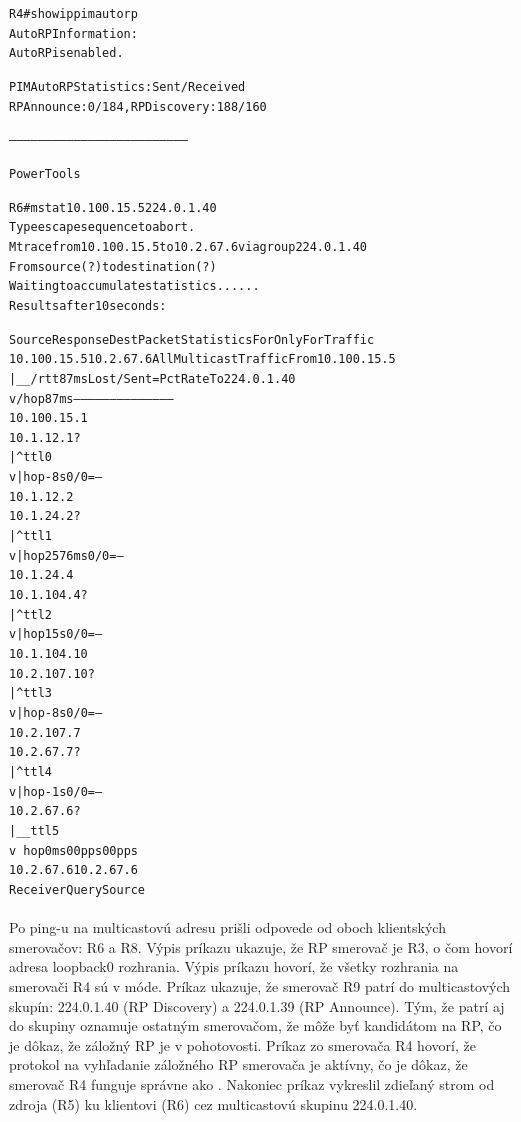 \documentclass[12pt,twoside,a4paper]{report}
\begin{document}
\noindent
{\selectfont
\begin{small}
\begin{alltt}
R4#show ip pim autorp
AutoRP Information:
  AutoRP is enabled.

PIM AutoRP Statistics: Sent/Received
  RP Announce: 0/184, RP Discovery: 188/160


---------------------------------------------------------------------------


Power Tools

R6#mstat 10.100.15.5 224.0.1.40
Type escape sequence to abort.
Mtrace from 10.100.15.5 to 10.2.67.6 via group 224.0.1.40
From source (?) to destination (?)
Waiting to accumulate statistics......
Results after 10 seconds:

  Source        Response Dest   Packet Statistics For     Only For Traffic
10.100.15.5     10.2.67.6       All Multicast Traffic     From 10.100.15.5
     |       __/  rtt 87   ms   Lost/Sent = Pct  Rate     To 224.0.1.40
     v      /     hop 87   ms   ---------------------     --------------------
10.100.15.1
10.1.12.1       ?
     |     ^      ttl   0
     v     |      hop -8   s     0/0 = --%
10.1.12.2
10.1.24.2       ?
     |     ^      ttl   1
     v     |      hop 2576 ms    0/0 = --%
10.1.24.4
10.1.104.4      ?
     |     ^      ttl   2
     v     |      hop 15   s     0/0 = --%
10.1.104.10
10.2.107.10     ?
     |     ^      ttl   3
     v     |      hop -8   s     0/0 = --%
10.2.107.7
10.2.67.7       ?
     |     ^      ttl   4
     v     |      hop -1   s     0/0 = --%
10.2.67.6       ?
     |      \__   ttl   5
     v         \  hop 0    ms        0         0 pps           0    0 pps
10.2.67.6       10.2.67.6
  Receiver      Query Source

\end{alltt}
\end{small}
}

\paragraph{}
Po ping-u na multicastovú adresu prišli odpovede od oboch klientských smerovačov: R6 a R8. Výpis príkazu  ukazuje, že RP smerovač je R3, o čom hovorí adresa loopback0 rozhrania. Výpis príkazu  hovorí, že všetky rozhrania na smerovači R4 sú v  móde. Príkaz  ukazuje, že smerovač R9 patrí do multicastových skupín: 224.0.1.40 (RP Discovery) a 224.0.1.39 (RP Announce). Tým, že patrí aj do skupiny  oznamuje ostatným smerovačom, že môže byť kandidátom na RP, čo je dôkaz, že záložný RP je v pohotovosti. Príkaz  zo smerovača R4 hovorí, že  protokol na vyhľadanie záložného RP smerovača je aktívny, čo je dôkaz, že smerovač R4 funguje správne ako . Nakoniec príkaz  vykreslil zdieľaný strom od zdroja (R5) ku klientovi (R6) cez multicastovú skupinu 224.0.1.40.
\end{document}

